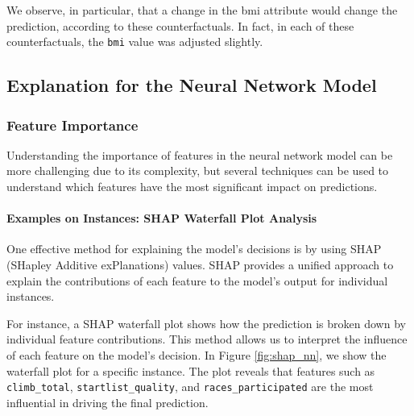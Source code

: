 \documentclass{article}
\begin{document}
We observe, in particular, that a change in the bmi attribute would change the prediction, according to these counterfactuals.
In fact, in each of these counterfactuals, the \texttt{bmi} value was adjusted slightly.










\subsection{Explanation for the Neural Network Model}

\subsubsection{Feature Importance}

Understanding the importance of features in the neural network model can be more challenging due to its complexity, but several techniques can be used to understand which features have the most significant impact on predictions.

\paragraph{Examples on Instances: SHAP Waterfall Plot Analysis}

One effective method for explaining the model's decisions is by using SHAP (SHapley Additive exPlanations) values. SHAP provides a unified approach to explain the contributions of each feature to the model's output for individual instances.

For instance, a SHAP waterfall plot shows how the prediction is broken down by individual feature contributions. This method allows us to interpret the influence of each feature on the model’s decision. In Figure \ref{fig:shap_nn}, we show the waterfall plot for a specific instance. The plot reveals that features such as \texttt{climb\_total}, \texttt{startlist\_quality}, and \texttt{races\_participated} are the most influential in driving the final prediction.
\end{document}

